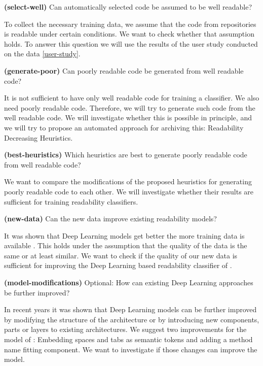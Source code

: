 \documentclass[%
class=scrreprt,
chapterprefix=false,%
open=right,%
twoside=false,%
paper=a4,%
logofile={Logo\_zentral\_farbig\_EN.png},%
thesistype=masterproposal,%
UKenglish,%
]{se2thesis}
\begin{document}
	\begin{resq} \textbf{(select-well)} Can automatically selected code be assumed to be well readable?\end{resq} \label{select-well}
	To collect the necessary training data, we assume that the code from repositories is readable under certain conditions. We want to check whether that assumption holds. To answer this question we will use the results of the user study conducted on the data \ref{user-study}.
	
	\begin{resq} \textbf{(generate-poor)} Can poorly readable code be generated from well readable code?\end{resq} \label{generate-poor}
	It is not sufficient to have only well readable code for training a classifier. We also need poorly readable code. Therefore, we will try to generate such code from the well readable code. We will investigate whether this is possible in principle, and we will try to propose an automated approach for archiving this: Readability Decreasing Heuristics.
	
	\begin{resq} \textbf{(best-heuristics)} Which heuristics are best to generate poorly readable code from well readable code?\end{resq} \label{best-heuristic}
	We want to compare the modifications of the proposed heuristics for generating poorly readable code to each other. We will investigate whether their results are sufficient for training readability classifiers.
	
	\begin{resq} \textbf{(new-data)} Can the new data improve existing readability models?\end{resq} \label{new-data}
	It was shown that Deep Learning models get better the more training data is available \cite{hestness2017deep}. This holds under the assumption that the quality of the data is the same or at least similar. We want to check if the quality of our new data is sufficient for improving the Deep Learning based readability classifier of \citeauthor{mi2022towards} \cite{mi2022towards}.    
	
	\begin{resq} \textbf{(model-modifications)} Optional: How can existing Deep Learning approaches be further improved?\end{resq} \label{model-modifications}
	In recent years it was shown that Deep Learning models can be further improved by modifying the structure of the architecture or by introducing new components, parts or layers to existing architectures. We suggest two improvements for the model of \citeauthor{mi2022towards} \cite{mi2022towards}: Embedding spaces and tabs as semantic tokens and adding a method name fitting component. We want to investigate if those changes can improve the model.
	
\end{document}
